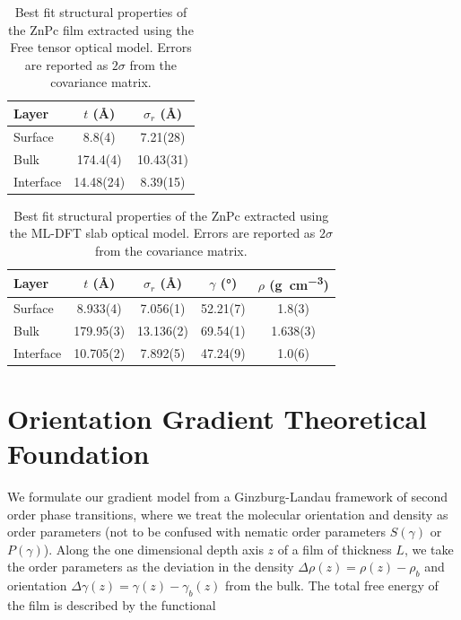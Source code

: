 \begin{table}
  \centering
  \caption{Best fit structural properties of the ZnPc film extracted using the Free tensor optical model. Errors are reported as \(2\sigma\) from the covariance matrix.}\label{tab:S1}
  \begin{tabular}{l S[table-format=3.2(2)] S[table-format=2.2(2)]}
    \toprule
    Layer & {\(t\) (\unit{\angstrom})} & {\(\sigma_{r}\) (\unit{\angstrom})} \\
    \midrule
    Surface & 8.8(4) & 7.21(28) \\
    Bulk & 174.4(4) & 10.43(31) \\
    Interface & 14.48(24) & 8.39(15) \\
    \bottomrule
  \end{tabular}
\end{table}

\begin{table}
  \centering
  \caption{Best fit structural properties of the ZnPc extracted using the ML-DFT slab optical model. Errors are reported as \(2\sigma\) from the covariance matrix.}\label{tab:S2}
  \begin{tabular}{l S[table-format=3.3(1)] S[table-format=2.3(1)] S[table-format=2.2(1)] S[table-format=1.3(1)]}
    \toprule
    Layer & {\(t\) (\unit{\angstrom})} & {\(\sigma_{r}\) (\unit{\angstrom})} & {\(\gamma\) (\unit{\degree})} & {\(\rho\) (\unit{g.cm^{-3}})} \\
    \midrule
    Surface & 8.933(4) & 7.056(1) & 52.21(7) & 1.8(3) \\
    Bulk & 179.95(3) & 13.136(2) & 69.54(1) & 1.638(3) \\
    Interface & 10.705(2) & 7.892(5) & 47.24(9) & 1.0(6) \\
    \bottomrule
  \end{tabular}
\end{table}

\section{Orientation Gradient Theoretical Foundation}\label{sec:orientation-gradient-theoretical-foundation-1}

We formulate our gradient model from a Ginzburg-Landau framework of second order phase transitions, where we treat the molecular orientation and density as order parameters (not to be confused with nematic order parameters \(S(\gamma)\) or \(P(\gamma)\)).\autocite{gennesPhysicsLiquidCrystals2023,Ginzburg2009} Along the one dimensional depth axis \(z\) of a film of thickness \(L\), we take the order parameters as the deviation in the density \(\Delta\rho(z) = \rho(z) - \rho_{b}\) and orientation \(\Delta\gamma(z) = \gamma(z) - \gamma_{b}(z)\) from the bulk. The total free energy of the film is described by the functional

